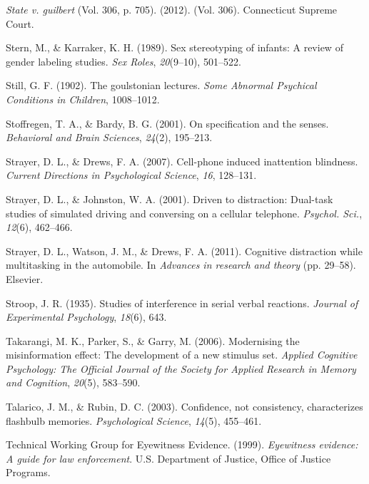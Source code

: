 \documentclass[
]{krantz}
\newlength{\cslhangindent}
\newenvironment{CSLReferences}[2] %
 {\begin{list}{}{%
  \setlength{\itemindent}{0pt}
  \setlength{\leftmargin}{0pt}
  \setlength{\parsep}{0pt}
  \ifodd #1
   \setlength{\leftmargin}{\cslhangindent}
   \setlength{\itemindent}{-1\cslhangindent}
  \fi
  \setlength{\itemsep}{#2\baselineskip}}}
 {\end{list}}
\begin{document}
\begin{CSLReferences}{1}{0}
\emph{State v. guilbert} (Vol. 306, p. 705). (2012). (Vol. 306). Connecticut Supreme Court.

Stern, M., \& Karraker, K. H. (1989). Sex stereotyping of infants: A review of gender labeling studies. \emph{Sex Roles}, \emph{20}(9--10), 501--522.

Still, G. F. (1902). The goulstonian lectures. \emph{Some Abnormal Psychical Conditions in Children}, 1008--1012.

Stoffregen, T. A., \& Bardy, B. G. (2001). On specification and the senses. \emph{Behavioral and Brain Sciences}, \emph{24}(2), 195--213.

Strayer, D. L., \& Drews, F. A. (2007). Cell-phone induced inattention blindness. \emph{Current Directions in Psychological Science}, \emph{16}, 128--131.

Strayer, D. L., \& Johnston, W. A. (2001). Driven to distraction: Dual-task studies of simulated driving and conversing on a cellular telephone. \emph{Psychol. Sci.}, \emph{12}(6), 462--466.

Strayer, D. L., Watson, J. M., \& Drews, F. A. (2011). Cognitive distraction while multitasking in the automobile. In \emph{Advances in research and theory} (pp. 29--58). Elsevier.

Stroop, J. R. (1935). Studies of interference in serial verbal reactions. \emph{Journal of Experimental Psychology}, \emph{18}(6), 643.

Takarangi, M. K., Parker, S., \& Garry, M. (2006). Modernising the misinformation effect: The development of a new stimulus set. \emph{Applied Cognitive Psychology: The Official Journal of the Society for Applied Research in Memory and Cognition}, \emph{20}(5), 583--590.

Talarico, J. M., \& Rubin, D. C. (2003). Confidence, not consistency, characterizes flashbulb memories. \emph{Psychological Science}, \emph{14}(5), 455--461.

Technical Working Group for Eyewitness Evidence. (1999). \emph{Eyewitness evidence: A guide for law enforcement}. U.S. Department of Justice, Office of Justice Programs.


\end{CSLReferences}
\end{document}

